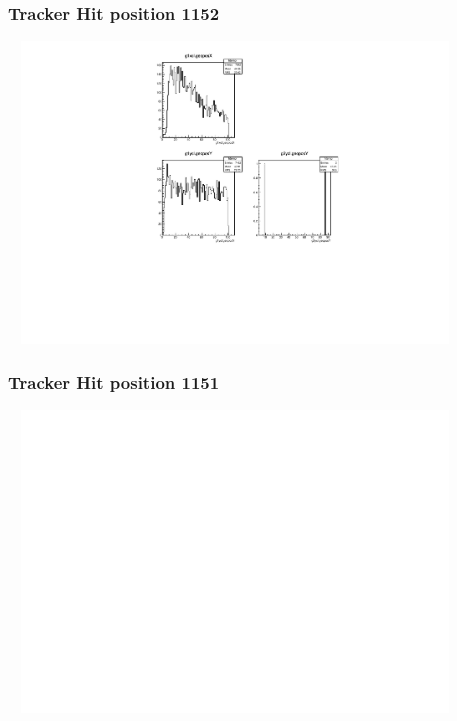 \documentclass[slidestop,compress,mathserif]{beamer}
\begin{document}
\begin{frame}\frametitle{Tracker Hit position 1152}
	 \includegraphics[width=12cm,height=8cm]{Tracker_Hit_position_1152.pdf}
\end{frame}
\begin{frame}\frametitle{Tracker Hit position 1151}
	 \includegraphics[width=12cm,height=8cm]{Tracker_Hit_position_1151.pdf}
\end{frame}
\end{document}
